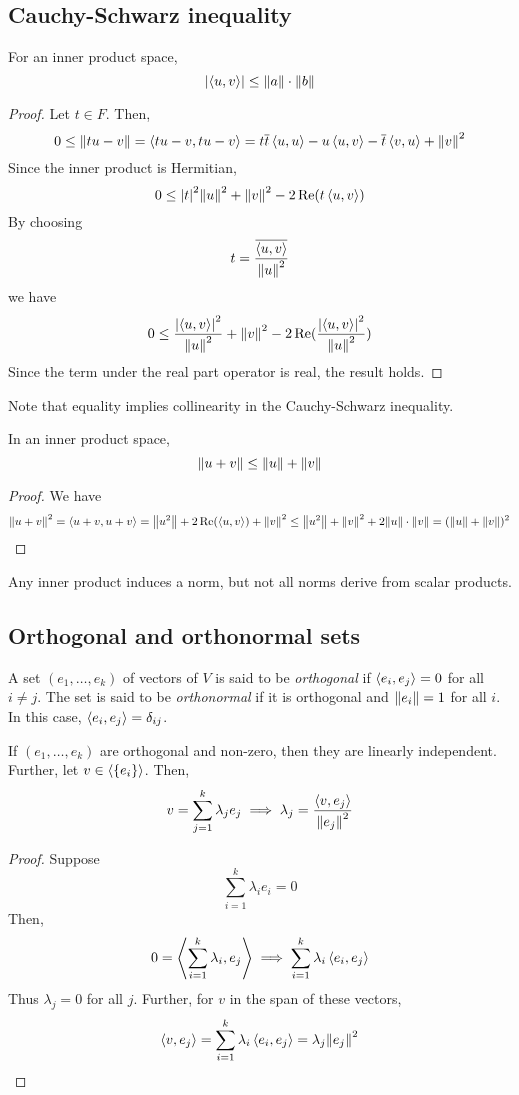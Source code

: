 \subsection{Cauchy-Schwarz inequality}
\begin{lemma}
	For an inner product space,
	\[
		\abs{\left\langle{u,v}\right\rangle} \leq \norm{a} \cdot \norm{b}
	\]
\end{lemma}
\begin{proof}
	Let \( t \in F \).
	Then,
	\[
		0 \leq \norm{t u - v} = \left\langle{tu - v, tu - v}\right\rangle = t \overline t \left\langle{u,u}\right\rangle - u \left\langle{u,v}\right\rangle - \overline t \left\langle{v,u}\right\rangle + \norm{v}^2
	\]
	Since the inner product is Hermitian,
	\[
		0 \leq \abs{t}^2 \norm{u}^2 + \norm{v}^2 - 2 \Re(t \left\langle{u,v}\right\rangle)
	\]
	By choosing
	\[
		t = \frac{\overline{\left\langle{u,v}\right\rangle}}{\norm{u}^2}
	\]
	we have
	\[
		0 \leq \frac{\abs{\left\langle{u,v}\right\rangle}^2}{\norm{u}^2} + \norm{v}^2 - 2 \Re(\frac{\abs{\left\langle{u,v}\right\rangle}^2}{\norm{u}^2})
	\]
	Since the term under the real part operator is real, the result holds.
\end{proof}
\noindent Note that equality implies collinearity in the Cauchy-Schwarz inequality.
\begin{corollary}
	In an inner product space,
	\[
		\norm{u+v} \leq \norm{u} + \norm{v}
	\]
\end{corollary}
\begin{proof}
	We have
	\[
		\norm{u+v}^2 = \left\langle{u+v, u+v}\right\rangle = \norm{u^2} + 2 \Re(\left\langle{u,v}\right\rangle) + \norm{v}^2 \leq \norm{u^2} + \norm{v}^2 + 2 \norm{u} \cdot \norm{v} = (\norm{u} + \norm{v})^2
	\]
\end{proof}
\begin{remark}
	Any inner product induces a norm, but not all norms derive from scalar products.
\end{remark}

\subsection{Orthogonal and orthonormal sets}
\begin{definition}
	A set \( (e_1, \dots, e_k) \) of vectors of \( V \) is said to be \textit{orthogonal} if \( \left\langle{e_i, e_j}\right\rangle = 0 \) for all \( i \neq j \).
	The set is said to be \textit{orthonormal} if it is orthogonal and \( \norm{e_i} = 1 \) for all \( i \).
	In this case, \( \left\langle{e_i, e_j}\right\rangle = \delta_{ij} \).
\end{definition}
\begin{lemma}
	If \( (e_1, \dots, e_k) \) are orthogonal and non-zero, then they are linearly independent.
	Further, let \( v \in \langle{} \qty{e_i} \rangle \).
	Then,
	\[
		v = \sum_{j=1}^k \lambda_j e_j \implies \lambda_j = \frac{\left\langle{v, e_j}\right\rangle}{\norm{e_j}^2}
	\]
\end{lemma}
\begin{proof}
	Suppose
	\[
		\sum_{i=1}^k \lambda_i e_i = 0
	\]
	Then,
	\[
		0 = \left\langle{\sum_{i=1}^k \lambda_i, e_j}\right\rangle \implies \sum_{i=1}^k \lambda_i \left\langle{e_i, e_j}\right\rangle
	\]
	Thus \( \lambda_j = 0 \) for all \( j \).
	Further, for \( v \) in the span of these vectors,
	\[
		\left\langle{v, e_j}\right\rangle = \sum_{i=1}^k \lambda_i \left\langle{e_i, e_j}\right\rangle = \lambda_j \norm{e_j}^2
	\]
\end{proof}

